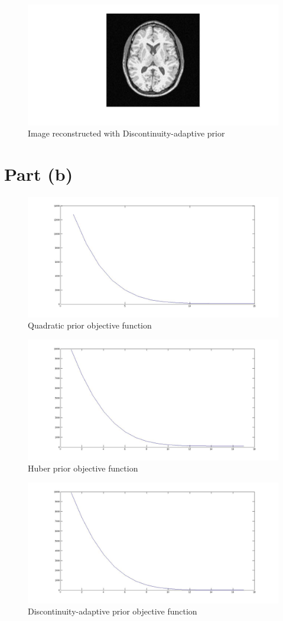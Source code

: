 \documentclass[11pt]{article}
\begin{document}
\begin{figure}[H]
\caption{Image reconstructed with Discontinuity-adaptive prior}
\centerline{\includegraphics[scale=0.3]{discRec}}
\end{figure}

\section*{Part (b)}

\begin{figure}[H]
\caption{Quadratic prior objective function}
\centerline{\includegraphics[scale=0.3]{quadObj}}
\end{figure}

\begin{figure}[H]
\caption{Huber prior objective function}
\centerline{\includegraphics[scale=0.3]{huberObj}}
\end{figure}

\begin{figure}[H]
\caption{Discontinuity-adaptive prior objective function}
\centerline{\includegraphics[scale=0.3]{discObj}}
\end{figure}
\end{document}
